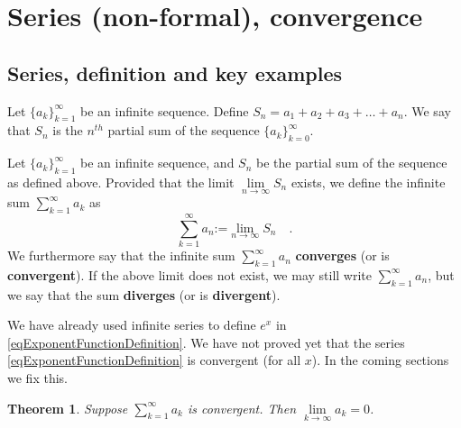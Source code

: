 \documentclass[12pt]{book}
\newcommand{\eqdef}{\textbf{:=}}
\newtheorem{theorem}{Theorem}[section]
\renewcommand{\emph}{\textbf}
\begin{document}
\section{Series (non-formal), convergence}\label{secSeriesConvergence}
\subsection{Series, definition and key examples}
Let $\{a_k\}_{k=1}^\infty$ be an infinite sequence. Define $S_n= a_1+a_2+a_3+\dots+a_n$. We say that $S_n$ is the $n^{th}$ partial sum of the sequence $\{a_k\}_{k=0}^\infty$.

Let $\{a_k\}_{k=1}^\infty$ be an infinite sequence, and $S_n$ be the partial sum of the sequence as defined above. Provided that the limit $\lim\limits_{n\to\infty} S_n$ exists, we define the infinite sum $\sum\limits_{k=1}^\infty a_k $ as
\begin{equation}\boxed{
\sum_{k=1}^{\infty}a_n\eqdef \lim\limits_{n\to \infty} S_n\quad .
}
\end{equation}
We furthermore say that the infinite sum $\sum\limits_{k=1}^{\infty}a_n$ \emph{converges} (or is \emph{convergent}). If the above limit does not exist, we may still write $\sum\limits_{k=1}^{\infty}a_n$, but we say that the sum \emph{diverges} (or is \emph{divergent}). 

We have already used infinite series to define $e^x$ in \eqref{eqExponentFunctionDefinition}. We have not proved yet that the series \eqref{eqExponentFunctionDefinition} is convergent (for all $x$). In the coming sections we fix this.

\begin{theorem}\label{thSummandsConvergentSeriesTendToZero}
Suppose $\sum\limits_{k=1}^\infty a_k$ is convergent. Then $\lim\limits_{k\to \infty } a_k=0$.
\end{theorem}
\end{document}
